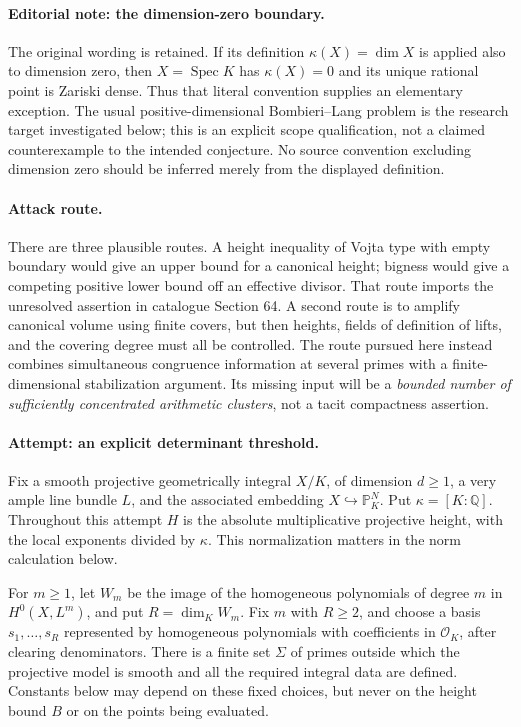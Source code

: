 \documentclass[11pt,a4paper]{article}
\newcommand{\Q}{\mathbb{Q}}
\numberwithin{equation}{section}
\begin{document}
\paragraph{Editorial note: the dimension-zero boundary.}
The original wording is retained. If its definition $\kappa(X)=\dim X$ is applied also to dimension zero, then $X=\operatorname{Spec}K$ has $\kappa(X)=0$ and its unique rational point is Zariski dense. Thus that literal convention supplies an elementary exception. The usual positive-dimensional Bombieri--Lang problem is the research target investigated below; this is an explicit scope qualification, not a claimed counterexample to the intended conjecture. No source convention excluding dimension zero should be inferred merely from the displayed definition.

\paragraph{Attack route.}
There are three plausible routes. A height inequality of Vojta type with empty boundary would give an upper bound for a canonical height; bigness would give a competing positive lower bound off an effective divisor. That route imports the unresolved assertion in catalogue Section 64. A second route is to amplify canonical volume using finite covers, but then heights, fields of definition of lifts, and the covering degree must all be controlled. The route pursued here instead combines simultaneous congruence information at several primes with a finite-dimensional stabilization argument. Its missing input will be a \emph{bounded number of sufficiently concentrated arithmetic clusters}, not a tacit compactness assertion.

\paragraph{Attempt: an explicit determinant threshold.}
Fix a smooth projective geometrically integral $X/K$, of dimension $d\geq1$, a very ample line bundle $L$, and the associated embedding $X\hookrightarrow\mathbb P^N_K$. Put $\kappa=[K:\Q]$. Throughout this attempt $H$ is the absolute multiplicative projective height, with the local exponents divided by $\kappa$. This normalization matters in the norm calculation below.

For $m\geq1$, let $W_m$ be the image of the homogeneous polynomials of degree $m$ in $H^0(X,L^m)$, and put $R=\dim_K W_m$. Fix $m$ with $R\geq2$, and choose a basis $s_1,\ldots,s_R$ represented by homogeneous polynomials with coefficients in $\mathcal O_K$, after clearing denominators. There is a finite set $\Sigma$ of primes outside which the projective model is smooth and all the required integral data are defined. Constants below may depend on these fixed choices, but never on the height bound $B$ or on the points being evaluated.
\end{document}
